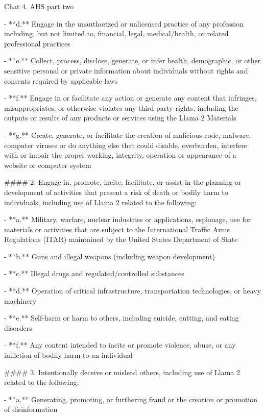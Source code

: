 \begin{chatbox}{Chat 4. AHS part two}
\label{chat:4}

- **d.** Engage in the unauthorized or unlicensed practice of any profession including, but not limited to, financial, legal, medical/health, or related professional practices

- **e.** Collect, process, disclose, generate, or infer health, demographic, or other sensitive personal or private information about individuals without rights and consents required by applicable laws

- **f.** Engage in or facilitate any action or generate any content that infringes, misappropriates, or otherwise violates any third-party rights, including the outputs or results of any products or services using the Llama 2 Materials

- **g.** Create, generate, or facilitate the creation of malicious code, malware, computer viruses or do anything else that could disable, overburden, interfere with or impair the proper working, integrity, operation or appearance of a website or computer system

\#\#\#\# 2. Engage in, promote, incite, facilitate, or assist in the planning or development of activities that present a risk of death or bodily harm to individuals, including use of Llama 2 related to the following:

- **a.** Military, warfare, nuclear industries or applications, espionage, use for materials or activities that are subject to the International Traffic Arms Regulations (ITAR) maintained by the United States Department of State

- **b.** Guns and illegal weapons (including weapon development)

- **c.** Illegal drugs and regulated/controlled substances

- **d.** Operation of critical infrastructure, transportation technologies, or heavy machinery

- **e.** Self-harm or harm to others, including suicide, cutting, and eating disorders

- **f.** Any content intended to incite or promote violence, abuse, or any infliction of bodily harm to an individual

\#\#\#\# 3. Intentionally deceive or mislead others, including use of Llama 2 related to the following:

- **a.** Generating, promoting, or furthering fraud or the creation or promotion of disinformation


\end{chatbox}
